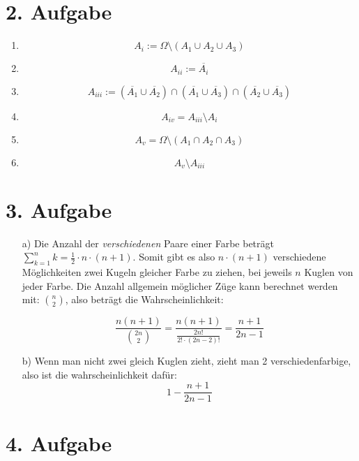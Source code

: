 \documentclass[10pt,a4paper,parskip=half]{scrartcl}
\begin{document}
\section*{2. Aufgabe}
\begin{enumerate}[\quad(i)]
	\item $$ A_i :=  \Omega \setminus (A_1 \cup A_2 \cup A_3)$$
	\item $$ A_{ii} := \overline{A_i} $$
	\item $$ A_{iii} :=  (\overline{A_1} \cup \overline{A_2}) \cap (\overline{A_1} \cup \overline{A_3}) \cap (\overline{A_2} \cup \overline{A_3}) $$
	\item $$A_{iv} = A_{iii} \setminus  A_i $$
	\item $$ A_{v} = \Omega \setminus (A_1 \cap A_2 \cap A_3) $$
	\item $$ A_v \setminus A_{iii} $$
\end{enumerate}
\section*{3. Aufgabe}
	\begin{enumerate}
		\item[a)] Die Anzahl der \textit{verschiedenen} Paare einer Farbe beträgt $\sum^n_{k=1} k = \frac12 \cdot n \cdot (n+1)$. 
		Somit gibt es also $n \cdot (n+1)$ verschiedene Möglichkeiten zwei Kugeln gleicher Farbe zu ziehen,
		bei jeweils $n$ Kuglen von jeder Farbe.
		Die Anzahl allgemein möglicher Züge kann berechnet werden mit: $\binom n2$,
		 also beträgt die Wahrscheinlichkeit:
		 
		 \[ \frac{n(n+1)}{\binom {2n}2} = \frac{n(n+1)}{\frac{2n!}{2! \cdot (2n - 2)!}} = \frac{n+1}{2n -1} \]
	\item[b)] Wenn man nicht zwei gleich Kuglen zieht, zieht man 2 verschiedenfarbige, also ist die wahrscheinlichkeit dafür:
	$$1 - \frac{n+1}{2n - 1} $$	
	\end{enumerate}
\section*{4. Aufgabe}
\end{document}
